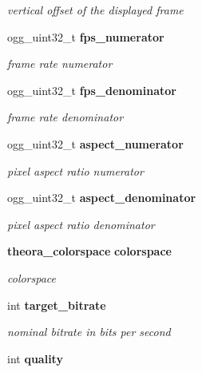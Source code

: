 \begin{CompactItemize}
\begin{CompactList}\small\item\em vertical offset of the displayed frame \item\end{CompactList}\item 
ogg\_\-uint32\_\-t {\bf fps\_\-numerator}\label{structtheora__info_b5b73000d86c892a805d7edc874ffdf8}

\begin{CompactList}\small\item\em frame rate numerator \item\end{CompactList}\item 
ogg\_\-uint32\_\-t {\bf fps\_\-denominator}\label{structtheora__info_fca33e94f7c437ea5d2dc4eb6ab4642a}

\begin{CompactList}\small\item\em frame rate denominator \item\end{CompactList}\item 
ogg\_\-uint32\_\-t {\bf aspect\_\-numerator}\label{structtheora__info_dcd1750a5bb10c3da1a29b2154683bb3}

\begin{CompactList}\small\item\em pixel aspect ratio numerator \item\end{CompactList}\item 
ogg\_\-uint32\_\-t {\bf aspect\_\-denominator}\label{structtheora__info_4dd10a45536510b8748e80fb6adf8e51}

\begin{CompactList}\small\item\em pixel aspect ratio denominator \item\end{CompactList}\item 
{\bf theora\_\-colorspace} {\bf colorspace}\label{structtheora__info_fc1972d0a6227b957f51baf417483e78}

\begin{CompactList}\small\item\em colorspace \item\end{CompactList}\item 
int {\bf target\_\-bitrate}\label{structtheora__info_d568c28dc5fa1f22630826e5eb95a874}

\begin{CompactList}\small\item\em nominal bitrate in bits per second \item\end{CompactList}\item 
int {\bf quality}\label{structtheora__info_48df8ab9e7ec3a47656c2e2028ee2dba}


\end{CompactItemize}
